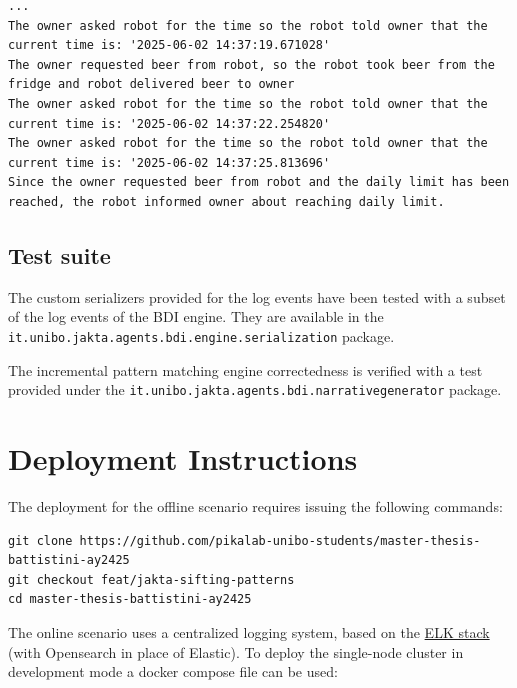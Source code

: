 \documentclass{scrartcl}
\begin{document}
\begin{landscape}
\begin{listing}
\begin{verbatim}
...
The owner asked robot for the time so the robot told owner that the current time is: '2025-06-02 14:37:19.671028'
The owner requested beer from robot, so the robot took beer from the fridge and robot delivered beer to owner 
The owner asked robot for the time so the robot told owner that the current time is: '2025-06-02 14:37:22.254820'
The owner asked robot for the time so the robot told owner that the current time is: '2025-06-02 14:37:25.813696'
Since the owner requested beer from robot and the daily limit has been reached, the robot informed owner about reaching daily limit.
\end{verbatim}
\caption{The domain-level log events extracted from the execution trace of the Domestic Robot application. For brevity ellipsis are used to omit additional occurrences of the robot reporting the time to the owner.}
\label{listing:example-narrative}
\end{listing}
\end{landscape}

\subsection{Test suite}

The custom serializers provided for the log events have been tested with a subset of the log events of the BDI engine. They are available in the \\ \verb|it.unibo.jakta.agents.bdi.engine.serialization| package.

The incremental pattern matching engine correctedness is verified with a test provided under the \verb|it.unibo.jakta.agents.bdi.narrativegenerator| package.

\section{Deployment Instructions}

The deployment for the offline scenario requires issuing the following commands:

\begin{verbatim}
git clone https://github.com/pikalab-unibo-students/master-thesis-battistini-ay2425
git checkout feat/jakta-sifting-patterns
cd master-thesis-battistini-ay2425
\end{verbatim}

The online scenario uses a centralized logging system, based on the \href{https://www.elastic.co/elastic-stack/}{ELK stack} (with Opensearch in place of Elastic).
%
To deploy the single-node cluster in development mode a docker compose file can be used:
\end{document}
